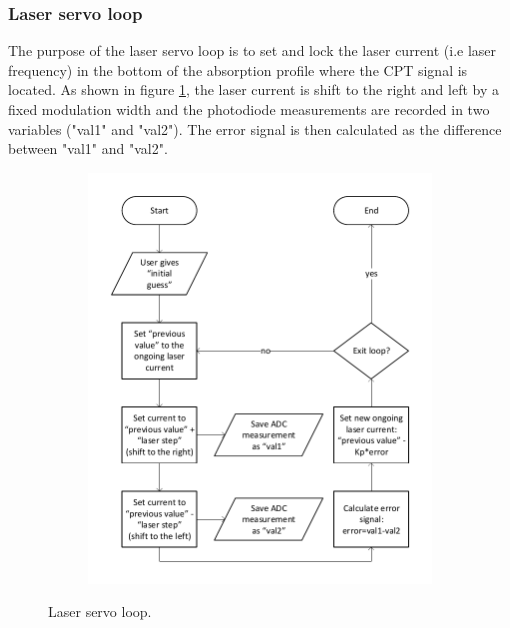 \documentclass[a4paper,12pt]{article}
\newcounter{step}
\begin{document}
\subsubsection{Laser servo loop}



The purpose of the laser servo loop is to set and lock the laser current (i.e laser frequency) in the bottom of the absorption profile where the CPT signal is located. As shown in figure \ref{fig:laser_servo_loop}, the laser current is shift to the right and left by a fixed modulation width and the photodiode measurements are recorded in two variables ("val1" and "val2"). The error signal is then calculated as the difference between "val1" and "val2".

\begin{figure}[!h]
\centering
\begin{subfigure}[c]{0.49\textwidth}
	\centering
	\captionsetup{justification=centering}
\end{subfigure}
\hfill
\begin{subfigure}[c]{0.49\textwidth}
	\centering
	\includegraphics[width=\textwidth]{Images/Laser_Servo_loop_flowchart.pdf}
	\captionsetup{justification=centering}
\end{subfigure}
 \caption{Laser servo loop.}
\label{fig:laser_servo_loop}
\end{figure}
\end{document}
